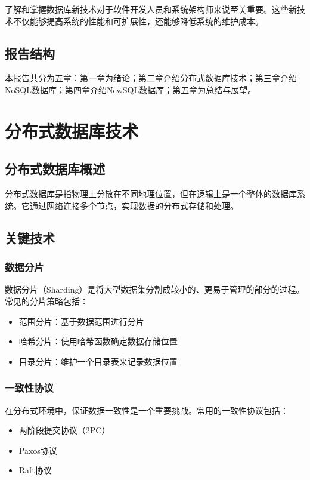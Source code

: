 \documentclass{report-uestc}
\begin{document}
了解和掌握数据库新技术对于软件开发人员和系统架构师来说至关重要。这些新技术不仅能够提高系统的性能和可扩展性，还能够降低系统的维护成本。

\section{报告结构}

本报告共分为五章：第一章为绪论；第二章介绍分布式数据库技术；第三章介绍NoSQL数据库；第四章介绍NewSQL数据库；第五章为总结与展望。

\chapter{分布式数据库技术}

\section{分布式数据库概述}

分布式数据库是指物理上分散在不同地理位置，但在逻辑上是一个整体的数据库系统。它通过网络连接多个节点，实现数据的分布式存储和处理。

\section{关键技术}

\subsection{数据分片}

数据分片（Sharding）是将大型数据集分割成较小的、更易于管理的部分的过程。常见的分片策略包括：
\begin{itemize}
\item 范围分片：基于数据范围进行分片
\item 哈希分片：使用哈希函数确定数据存储位置
\item 目录分片：维护一个目录表来记录数据位置
\end{itemize}

\subsection{一致性协议}

在分布式环境中，保证数据一致性是一个重要挑战。常用的一致性协议包括：
\begin{itemize}
\item 两阶段提交协议（2PC）
\item Paxos协议
\item Raft协议
\end{itemize}
\end{document}
